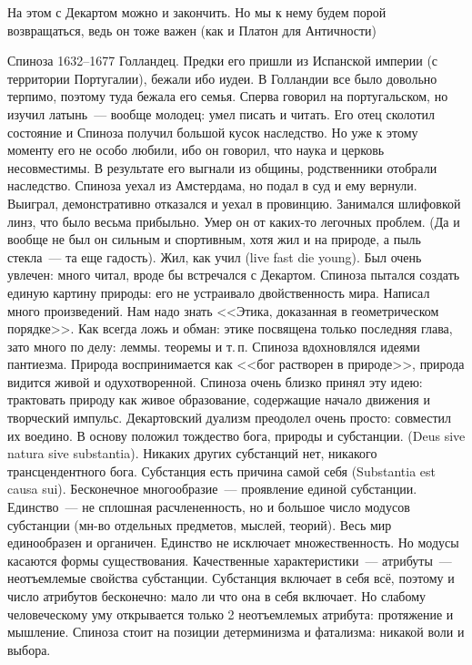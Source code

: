 На этом с Декартом можно и закончить. Но мы к нему будем порой возвращаться, ведь он тоже важен (как и Платон для Античности) 

Спиноза 1632--1677 Голландец.
Предки его пришли из Испанской империи (с территории Португалии), бежали ибо иудеи. В Голландии все было довольно терпимо, поэтому туда бежала его семья. Сперва говорил на португальском, но изучил латынь~--- вообще молодец: умел писать и читать. Его отец сколотил состояние и Спиноза получил большой кусок наследство. Но уже к этому моменту его не особо любили, ибо он говорил, что наука и церковь несовместимы. В результате его выгнали из общины, родственники отобрали наследство. Спиноза уехал из Амстердама, но подал в суд и ему вернули. Выиграл, демонстративно отказался и уехал в провинцию. Занимался шлифовкой линз, что было весьма прибыльно. Умер он от каких-то легочных проблем. (Да и вообще не был он сильным и спортивным, хотя жил и на природе, а пыль стекла~--- та еще гадость). Жил, как учил (live fast die young). Был очень увлечен: много читал, вроде бы встречался с Декартом. Спиноза пытался создать единую картину природы: его не устраивало двойственность мира. Написал много произведений. Нам надо знать <<Этика, доказанная в геометрическом порядке>>. Как всегда ложь и обман: этике посвящена только последняя глава, зато много по делу: леммы. теоремы и т.\,п. Спиноза вдохновлялся идеями пантиезма. Природа воспринимается как <<бог растворен в природе>>, природа видится живой и одухотворенной. Спиноза очень близко принял эту идею: трактовать природу как живое образование, содержащие начало движения и творческий импульс. Декартовский дуализм преодолел очень просто: совместил их воедино. В основу положил тождество бога, природы и субстанции. (Deus sive natura sive substantia). Никаких других субстанций нет, никакого трансцендентного бога. Субстанция есть причина самой себя (Substantia est causa sui). Бесконечное многообразие~--- проявление единой субстанции. Единство~--- не сплошная расчлененность, но и большое число модусов субстанции (мн-во отдельных предметов, мыслей, теорий). Весь мир единообразен и органичен. Единство не исключает множественность. Но модусы касаются формы существования.
Качественные характеристики~--- атрибуты~--- неотъемлемые свойства субстанции. Субстанция включает в себя всё, поэтому и число атрибутов бесконечно: мало ли что она в себя включает. Но слабому человеческому уму открывается только 2 неотъемлемых атрибута: протяжение и мышление.
Спиноза стоит на позиции детерминизма и фатализма: никакой воли и выбора.

